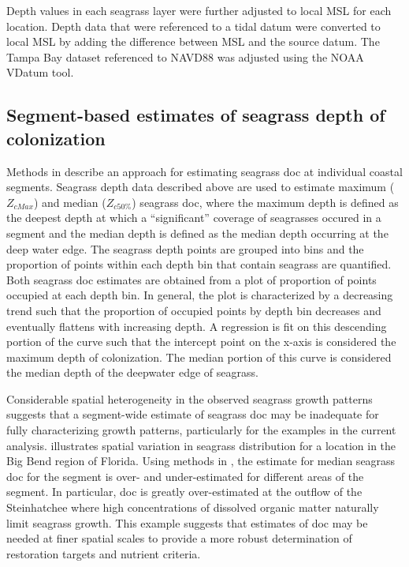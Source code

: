 \documentclass[letterpaper,12pt,oneside]{article}\usepackage[]{graphicx}\usepackage[]{color}
\begin{document}
Depth values in each seagrass layer were further adjusted to local \ac{MSL} for each location.  Depth data that were referenced to a tidal datum were converted to local \ac{MSL} by adding the difference between \ac{MSL} and the source datum.  The Tampa Bay dataset referenced to \ac{NAVD88} was adjusted using the \ac{NOAA} VDatum tool.  

\subsection{Segment-based estimates of seagrass depth of colonization}

Methods in  describe an approach for estimating seagrass \ac{doc} at individual coastal segments.  Seagrass depth data described above are used to estimate maximum ($Z_{cMax}$) and median ($Z_{c50\%}$) seagrass \ac{doc}, where the maximum depth is defined as the deepest depth at which a ``significant'' coverage of seagrasses occured in a segment and the median depth is defined as the median depth occurring at the deep water edge. The seagrass depth points are grouped into bins and the proportion of points within each depth bin that contain seagrass are quantified.  Both seagrass \ac{doc} estimates are obtained from a plot of proportion of points occupied at each depth bin.  In general, the plot is characterized by a decreasing trend such that the proportion of occupied points by depth bin decreases and eventually flattens with increasing depth.  A regression is fit on this descending portion of the curve such that the intercept point on the x-axis is considered the maximum depth of colonization.  The median portion of this curve is considered the median depth of the deepwater edge of seagrass.   

Considerable spatial heterogeneity in the observed seagrass growth patterns suggests that a segment-wide estimate of seagrass \ac{doc} may be inadequate for fully characterizing growth patterns, particularly for the examples in the current analysis.  illustrates spatial variation in seagrass distribution  for a location in the Big Bend region of Florida.  Using methods in , the estimate for median seagrass \ac{doc} for the segment is over- and under-estimated for different areas of the segment.  In particular, \ac{doc} is greatly over-estimated at the outflow of the Steinhatchee where high concentrations of dissolved organic matter naturally limit seagrass growth.  This example suggests that estimates of \ac{doc} may be needed at finer spatial scales to provide a more robust determination of restoration targets and nutrient criteria.
\end{document}
